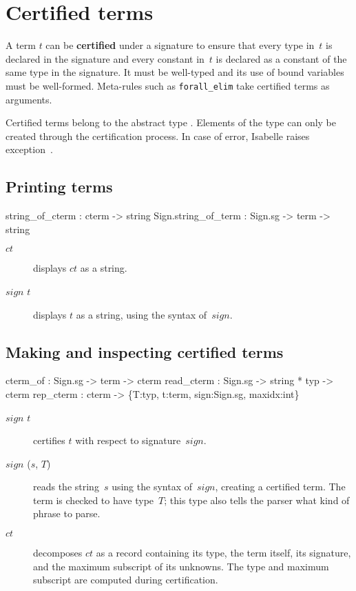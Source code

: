 \section{Certified terms} 
A term $t$ can be {\bf certified} under a signature to ensure that every
type in~$t$ is declared in the signature and every constant in~$t$ is
declared as a constant of the same type in the signature.  It must be
well-typed and its use of bound variables must be well-formed.  Meta-rules
such as {\tt forall_elim} take certified terms as arguments.

Certified terms belong to the abstract type .
Elements of the type can only be created through the certification process.
In case of error, Isabelle raises exception~\@.

\subsection{Printing terms}
\begin{ttbox} 
     string_of_cterm :           cterm -> string
Sign.string_of_term  : Sign.sg -> term -> string
\end{ttbox}
\begin{description}
\item[ $ct$] 
displays $ct$ as a string.

\item[ $sign$ $t$] 
displays $t$ as a string, using the syntax of~$sign$.
\end{description}

\subsection{Making and inspecting certified terms}
\begin{ttbox} 
cterm_of   : Sign.sg -> term -> cterm
read_cterm : Sign.sg -> string * typ -> cterm
rep_cterm  : cterm -> \{T:typ, t:term, sign:Sign.sg, maxidx:int\}
\end{ttbox}
\begin{description}
\item[ $sign$ $t$] 
certifies $t$ with respect to signature~$sign$.

\item[ $sign$ ($s$, $T$)] 
reads the string~$s$ using the syntax of~$sign$, creating a certified term.
The term is checked to have type~$T$; this type also tells the parser what
kind of phrase to parse.

\item[ $ct$] 
decomposes $ct$ as a record containing its type, the term itself, its
signature, and the maximum subscript of its unknowns.  The type and maximum
subscript are computed during certification.
\end{description}


